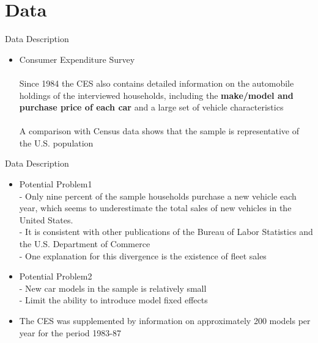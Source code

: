 \documentclass{beamer}
\begin{document}
\section{Data}
\begin{frame}{Data Description}
\begin{itemize}
	\item Consumer Expenditure Survey \\~\\
	Since 1984 the CES also contains detailed information on the automobile holdings of the interviewed households, including the \textbf{make/model and purchase price of each car} and a large set of vehicle characteristics \\~\\
	A comparison with Census data shows that the sample is representative of the U.S. population
\end{itemize}
\end{frame}
\begin{frame}{Data Description}
\begin{itemize}
	\item Potential Problem1 \\
	- Only nine percent of the sample households purchase a new vehicle each year, which seems to underestimate the total sales of new vehicles in the United States. \\
	- It is consistent with other publications of the Bureau of Labor Statistics and the U.S. Department of Commerce \\
	- One explanation for this divergence is the existence of fleet sales
	\item Potential Problem2 \\
	- New car models in the sample is relatively small \\
	- Limit the ability to introduce model fixed effects
	\item The CES was supplemented by information on approximately 200 models per year for the period 1983-87
\end{itemize}
\end{frame}
\end{document}
